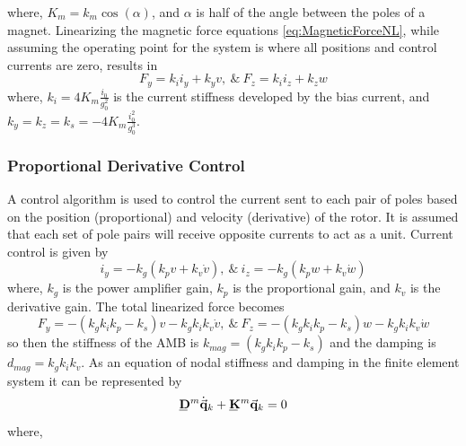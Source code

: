 where, $ K_m=k_m\cos(\alpha) $, and $ \alpha $ is half of the angle between the poles of a magnet. Linearizing the magnetic force equations \eqref{eq:MagneticForceNL}, while assuming the operating point for the system is where all positions and control currents are zero, results in
\begin{equation}\label{eq:MagneticForce}
F_y=k_ii_y+k_yv,\ \&\ F_z=k_ii_z+k_zw
\end{equation}
where, $ k_i=4K_m\frac{i_0}{g_0^2} $ is the current stiffness developed by the bias current, and $ k_y=k_z=k_s=-4K_m\frac{i_0^2}{g_0^3} $.
\subsubsection{Proportional Derivative Control}
A control algorithm is used to control the current sent to each pair of poles based on the position (proportional) and velocity (derivative) of the rotor. It is assumed that each set of pole pairs will receive opposite currents to act as a unit. Current control is given by 
\begin{equation}\label{eq:ControlCurrent}
i_y=-k_g(k_pv+k_v\dot{v}),\ \&\ i_z=-k_g(k_pw+k_v\dot{w})
\end{equation}
where, $ k_g $ is the power amplifier gain, $ k_p $ is the proportional gain, and $ k_v $ is the derivative gain. The total linearized force becomes
\begin{equation}\label{key}
F_y=-(k_gk_ik_p-k_s)v-k_gk_ik_v\dot{v},\ \&\ F_z=-(k_gk_ik_p-k_s)w-k_gk_ik_v\dot{w}
\end{equation}
so then the stiffness of the AMB is $ k_{mag}=(k_gk_ik_p-k_s) $ and the damping is $ d_{mag}=k_gk_ik_v $. As an equation of nodal stiffness and damping in the finite element system it can be represented by
\begin{equation}\label{eq:DiskNodeEquationofMotion}
\bunderline{\mathbf{D}}^m\dot{\vec{\mathbf{q}}}_k+\bunderline{\mathbf{K}}^m\vec{\mathbf{q}}_k=0
\end{equation}
where,
